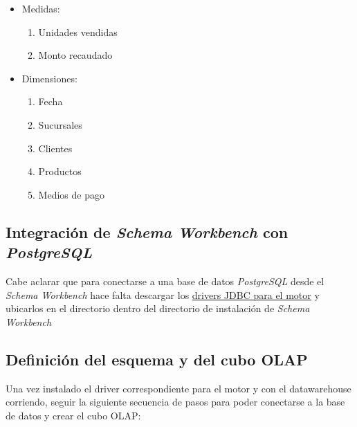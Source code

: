 \begin{itemize}
    \item Medidas:
        \begin{enumerate}
            \item Unidades vendidas
            \item Monto recaudado
        \end{enumerate}
    \item Dimensiones:
        \begin{enumerate}
            \item Fecha
            \item Sucursales
            \item Clientes
            \item Productos
            \item Medios de pago
        \end{enumerate}
\end{itemize}


\subsection*{Integración de \emph{Schema Workbench} con \emph{PostgreSQL}}

Cabe aclarar que para conectarse a una base de datos \emph{PostgreSQL} desde el \emph{Schema Workbench} hace falta descargar los \underline{\href{https://jdbc.postgresql.org/}{drivers JDBC para el motor}} y ubicarlos en el directorio  dentro del directorio de instalación de \emph{Schema Workbench} 

\subsection{Definición del esquema y del cubo OLAP}

Una vez instalado el driver correspondiente para el motor y con el datawarehouse corriendo, seguir la siguiente secuencia de pasos para poder conectarse a la base de datos y crear el cubo OLAP:


